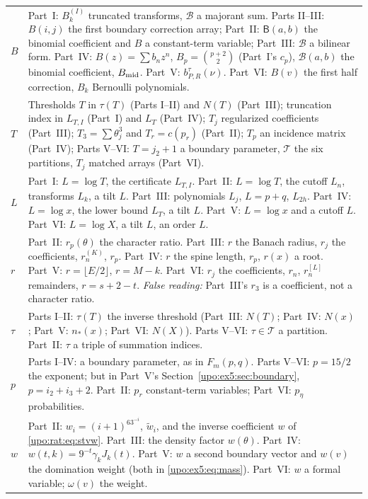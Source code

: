 \documentclass[11pt,letterpaper]{article}
\theoremstyle{remark}\newtheorem{remark}[theorem]{Remark}
\numberwithin{equation}{section}
\newcommand{\B}{\mathcal B}
\newcommand{\Tset}{\mathcal T}
\begin{document}
\begin{longtable}{@{}>{\raggedright\arraybackslash}p{} >{\raggedright\arraybackslash}p{}@{}}
$B$ & Part~I: $B_k^{(I)}$ truncated transforms, $\mathcal B$ a majorant sum. Parts II--III: $B(i,j)$ the first boundary correction array; Part~II: $\mathsf B(a,b)$ the binomial coefficient and $B$ a constant-term variable; Part~III: $\B$ a bilinear form. Part~IV: $B(z)=\sum b_nz^n$, $B_p=\binom{p+2}2$ (Part~I's $c_p$), $\mathcal B(a,b)$ the binomial coefficient, $B_{\rm mid}$. Part~V: $b^\tau_{P,R}(\nu)$. Part~VI: $B(v)$ the first half correction, $B_k$ Bernoulli polynomials.\\
$T$ & Thresholds $T$ in $\tau(T)$ (Parts I--II) and $N(T)$ (Part~III); truncation index in $L_{T,I}$ (Part~I) and $L_T$ (Part~IV); $T_j$ regularized coefficients (Part~III); $T_3=\sum\theta_j^3$ and $T_r=c(p_r)$ (Part~II); $T_p$ an incidence matrix (Part~IV); Parts V--VI: $T=j_2+1$ a boundary parameter, $\Tset$ the six partitions, $T_j$ matched arrays (Part~VI).\\
$L$ & Part~I: $L=\log T$, the certificate $L_{T,I}$. Part~II: $L=\log T$, the cutoff $L_n$, transforms $L_k$, a tilt $L$. Part~III: polynomials $L_j$, $L=p+q$, $L_{2h}$. Part~IV: $L=\log x$, the lower bound $L_T$, a tilt $L$. Part~V: $L=\log x$ and a cutoff $L$. Part~VI: $L=\log X$, a tilt $L$, an order $L$.\\
$r$ & Part~II: $r_p(\theta)$ the character ratio. Part~III: $r$ the Banach radius, $r_j$ the coefficients, $r_n^{(K)}$, $r_p$. Part~IV: $r$ the spine length, $r_p$, $r(x)$ a root. Part~V: $r=\lfloor E/2\rfloor$, $r=M-k$. Part~VI: $r_j$ the coefficients, $r_n$, $r^{[L]}_n$ remainders, $r=s+2-t$. \emph{False reading:} Part~III's $r_3$ is a coefficient, not a character ratio.\\
$\tau$ & Parts I--II: $\tau(T)$ the inverse threshold (Part~III: $N(T)$; Part~IV: $N(x)$; Part~V: $n_*(x)$; Part~VI: $N(X)$). Parts V--VI: $\tau\in\Tset$ a partition. Part~II: $\tau$ a triple of summation indices.\\
$p$ & Parts I--IV: a boundary parameter, as in $F_m(p,q)$. Parts V--VI: $p=15/2$ the exponent; but in Part~V's Section~\ref{upo:ex5:sec:boundary}, $p=i_2+i_3+2$. Part~II: $p_r$ constant-term variables; Part~VI: $p_\eta$ probabilities.\\
$w$ & Part~II: $w_i=(i+1)^63^{-i}$, $\widetilde w_i$, and the inverse coefficient $w$ of \eqref{upo:rat:eq:stvw}. Part~III: the density factor $w(\theta)$. Part~IV: $w(t,k)=9^{-t}\gamma_kJ_k(t)$. Part~V: $w$ a second boundary vector and $w(v)$ the domination weight (both in \eqref{upo:ex5:eq:mass}). Part~VI: $w$ a formal variable; $\omega(v)$ the weight.\\

\end{longtable}
\end{document}

